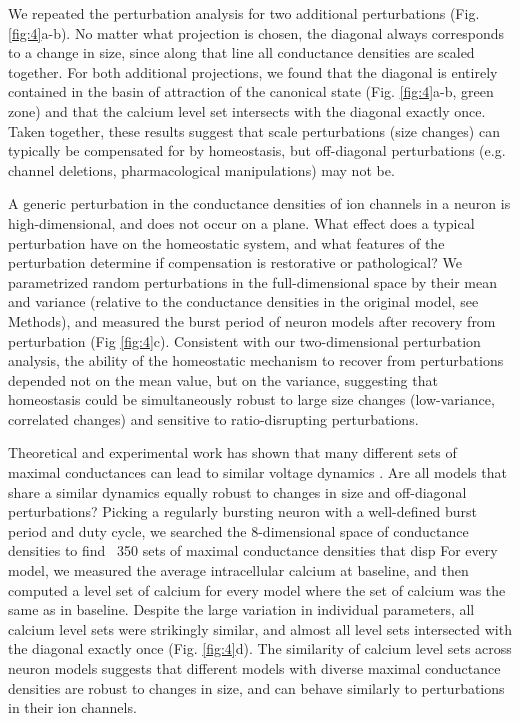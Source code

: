 \documentclass[9pt,lineno]{elife}
\begin{document}
We repeated the perturbation analysis for two additional perturbations (Fig. \ref{fig:4}a-b). No matter what projection is chosen, the diagonal always corresponds to a change in size, since along that line all conductance densities are scaled together. For both additional projections, we found that the diagonal is entirely contained in the basin of attraction of the canonical state (Fig. \ref{fig:4}a-b, green zone) and that the calcium level set intersects with the diagonal exactly once. Taken together, these results suggest that scale perturbations (size changes) can typically be compensated for by homeostasis, but off-diagonal perturbations (e.g. channel deletions, pharmacological manipulations) may not be. 

A generic perturbation in the conductance densities of ion channels in a neuron is high-dimensional, and does not occur on a plane. What effect does a typical perturbation have on the homeostatic system, and what features of the perturbation determine if compensation is restorative or pathological? We parametrized random perturbations in the full-dimensional space by their mean and variance (relative to the conductance densities in the original model, see Methods), and measured the burst period of neuron models after recovery from perturbation (Fig \ref{fig:4}c). Consistent with our two-dimensional perturbation analysis, the ability of the homeostatic mechanism to recover from perturbations depended not on the mean value, but on the variance, suggesting that homeostasis could be simultaneously robust to large size changes (low-variance, correlated changes) and sensitive to ratio-disrupting perturbations. 




Theoretical and experimental work has shown that many different sets of maximal conductances can lead to similar voltage dynamics \citep{Prinz:2003eza,Golowasch:2002cza,Goldman:2001vva,Taylor:2009kb, Marder:2011de,Caplan:2014jd,Swensen:2005bo, Aizenman:2003fc}. Are all models that share a similar dynamics equally robust to changes in size and off-diagonal perturbations? Picking a regularly bursting neuron with a well-defined burst period and duty cycle, we searched the 8-dimensional space of conductance densities to find ~350 sets of maximal conductance densities that disp For every model, we measured the average intracellular calcium at baseline, and then computed a level set of calcium for every model where the set of calcium was the same as in baseline. Despite the large variation in individual parameters, all calcium level sets were strikingly similar, and almost all level sets intersected with the diagonal exactly once (Fig. \ref{fig:4}d). The similarity of calcium level sets across neuron models suggests that different models with diverse maximal conductance densities are  robust to changes in size, and can behave similarly to perturbations in their ion channels. 
\end{document}
